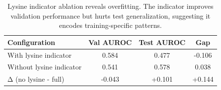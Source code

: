 \begin{table}[t]
\centering
\caption{Lysine indicator ablation reveals overfitting. The indicator improves validation performance but hurts test generalization, suggesting it encodes training-specific patterns.}
\label{tab:lysine_paradox}
\small
\begin{tabular}{@{}lccc@{}}
\toprule
\textbf{Configuration} & \textbf{Val AUROC} & \textbf{Test AUROC} & \textbf{Gap} \\
\midrule
With lysine indicator & 0.584 & 0.477 & -0.106 \\
Without lysine indicator & 0.541 & 0.578 & 0.038 \\
\midrule
Δ (no lysine - full) & -0.043 & +0.101 & +0.144 \\
\bottomrule
\end{tabular}
\end{table}
